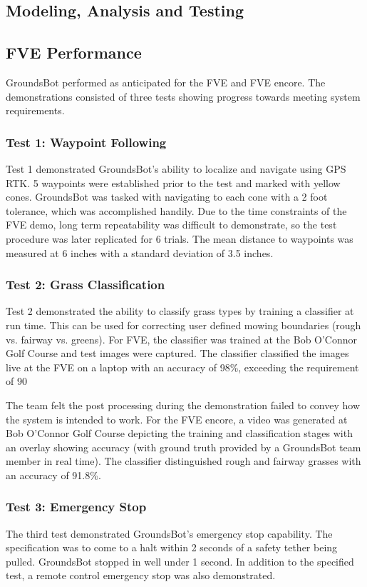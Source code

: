 \documentclass[12pt]{extarticle}
\begin{document}
  \subsection{Modeling, Analysis and Testing}
  
  \subsection{FVE Performance}
  GroundsBot performed as anticipated for the FVE and FVE encore.  The demonstrations consisted of three tests showing progress towards meeting system requirements.
  \subsubsection{Test 1: Waypoint Following}
  Test 1 demonstrated GroundsBot's ability to localize and navigate using GPS RTK. 5 waypoints were established prior to the test and marked with yellow cones. GroundsBot was tasked with navigating to each cone with a 2 foot tolerance, which was accomplished handily. Due to the time constraints of the FVE demo, long term repeatability was difficult to demonstrate, so the test procedure was later replicated for 6 trials. The mean distance to waypoints was measured at 6 inches with a standard deviation of 3.5 inches. 
  \subsubsection{Test 2: Grass Classification}
  Test 2 demonstrated the ability to classify grass types by training a classifier at run time. This can be used for correcting user defined mowing boundaries (rough vs. fairway vs. greens). For FVE, the classifier was trained at the Bob O'Connor Golf Course and test images were captured. The classifier classified the images live at the FVE on a laptop with an accuracy of 98\%, exceeding the requirement of 90%
    
  The team felt the post processing during the demonstration failed to convey how the system is intended to work. For the FVE encore, a video was generated at Bob O'Connor Golf Course depicting the training and classification stages with an overlay showing accuracy (with ground truth provided by a GroundsBot team member in real time). The classifier distinguished rough and fairway grasses with an accuracy of 91.8\%.
  \subsubsection{Test 3: Emergency Stop}
  The third test demonstrated GroundsBot's emergency stop capability. The specification was to come to a halt within 2 seconds of a safety tether being pulled. GroundsBot stopped in well under 1 second. In addition to the specified test, a remote control emergency stop was also demonstrated.
  
\end{document}
